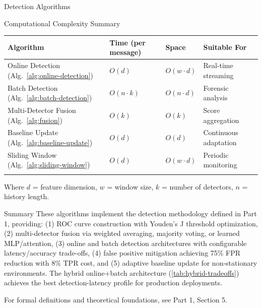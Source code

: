 \documentclass[
  ignorenonframetext,
]{beamer}
\newcounter{none} %
\begin{document}
\begin{frame}{Detection Algorithms}
\begin{block}{Computational Complexity Summary}
{\def\LTcaptype{none} %
\begin{longtable}[]{@{}
  >{\raggedright\arraybackslash}p{}
  >{\raggedright\arraybackslash}p{}
  >{\raggedright\arraybackslash}p{}
  >{\raggedright\arraybackslash}p{}@{}}
\toprule\noalign{}
\begin{minipage}[b]{\linewidth}\raggedright
Algorithm
\end{minipage} & \begin{minipage}[b]{\linewidth}\raggedright
Time (per message)
\end{minipage} & \begin{minipage}[b]{\linewidth}\raggedright
Space
\end{minipage} & \begin{minipage}[b]{\linewidth}\raggedright
Suitable For
\end{minipage} \\
\midrule\noalign{}
\endhead
Online Detection (Alg.~\ref{alg:online-detection}) & \(O(d)\) &
\(O(w \cdot d)\) & Real-time streaming \\
Batch Detection (Alg.~\ref{alg:batch-detection}) & \(O(n \cdot k)\) &
\(O(n \cdot d)\) & Forensic analysis \\
Multi-Detector Fusion (Alg.~\ref{alg:fusion}) & \(O(k)\) & \(O(k)\) &
Score aggregation \\
Baseline Update (Alg.~\ref{alg:baseline-update}) & \(O(d)\) & \(O(d)\) &
Continuous adaptation \\
Sliding Window (Alg.~\ref{alg:sliding-window}) & \(O(d)\) &
\(O(w \cdot d)\) & Periodic monitoring \\
\bottomrule\noalign{}
\end{longtable}
}

Where \(d\) = feature dimension, \(w\) = window size, \(k\) = number of
detectors, \(n\) = history length.
\end{block}

\begin{block}{Summary}
\protect{}\label{summary}
These algorithms implement the detection methodology defined in Part 1,
providing: (1) ROC curve construction with Youden's J threshold
optimization, (2) multi-detector fusion via weighted averaging, majority
voting, or learned MLP/attention, (3) online and batch detection
architectures with configurable latency/accuracy trade-offs, (4) false
positive mitigation achieving 75\% FPR reduction with 8\% TPR cost, and
(5) adaptive baseline update for non-stationary environments. The hybrid
online+batch architecture (\cref{tab:hybrid-tradeoffs}) achieves the
best detection-latency profile for production deployments.

For formal definitions and theoretical foundations, see Part 1, Section
5.
\end{block}
\end{frame}
\end{document}
